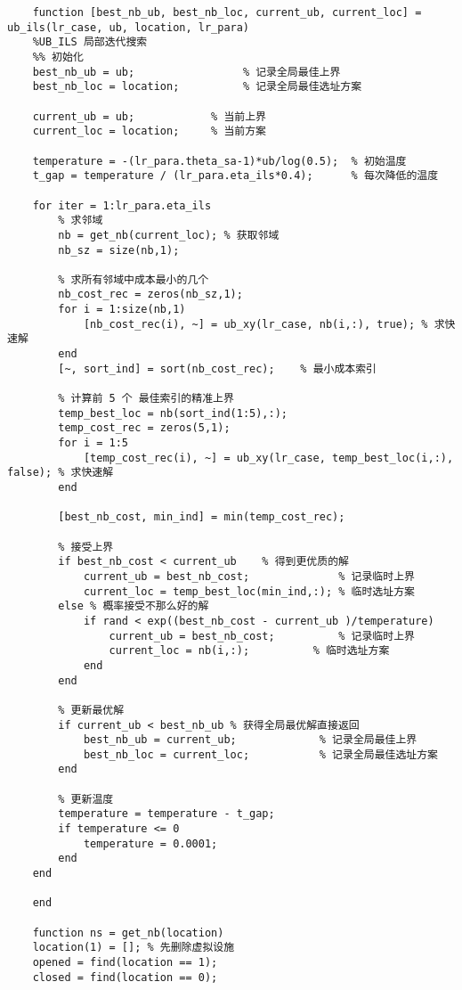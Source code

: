 {\begin{lstlisting}
    function [best_nb_ub, best_nb_loc, current_ub, current_loc] = ub_ils(lr_case, ub, location, lr_para)
    %UB_ILS 局部迭代搜索
    %% 初始化
    best_nb_ub = ub;                 % 记录全局最佳上界
    best_nb_loc = location;          % 记录全局最佳选址方案

    current_ub = ub;            % 当前上界
    current_loc = location;     % 当前方案

    temperature = -(lr_para.theta_sa-1)*ub/log(0.5);  % 初始温度
    t_gap = temperature / (lr_para.eta_ils*0.4);      % 每次降低的温度

    for iter = 1:lr_para.eta_ils
        % 求邻域
        nb = get_nb(current_loc); % 获取邻域
        nb_sz = size(nb,1);

        % 求所有邻域中成本最小的几个
        nb_cost_rec = zeros(nb_sz,1);
        for i = 1:size(nb,1)
            [nb_cost_rec(i), ~] = ub_xy(lr_case, nb(i,:), true); % 求快速解
        end
        [~, sort_ind] = sort(nb_cost_rec);    % 最小成本索引

        % 计算前 5 个 最佳索引的精准上界
        temp_best_loc = nb(sort_ind(1:5),:);
        temp_cost_rec = zeros(5,1);
        for i = 1:5
            [temp_cost_rec(i), ~] = ub_xy(lr_case, temp_best_loc(i,:), false); % 求快速解
        end
        
        [best_nb_cost, min_ind] = min(temp_cost_rec);

        % 接受上界
        if best_nb_cost < current_ub    % 得到更优质的解
            current_ub = best_nb_cost;              % 记录临时上界
            current_loc = temp_best_loc(min_ind,:); % 临时选址方案
        else % 概率接受不那么好的解
            if rand < exp((best_nb_cost - current_ub )/temperature)
                current_ub = best_nb_cost;          % 记录临时上界
                current_loc = nb(i,:);          % 临时选址方案
            end
        end
        
        % 更新最优解
        if current_ub < best_nb_ub % 获得全局最优解直接返回
            best_nb_ub = current_ub;             % 记录全局最佳上界
            best_nb_loc = current_loc;           % 记录全局最佳选址方案
        end
        
        % 更新温度
        temperature = temperature - t_gap;
        if temperature <= 0
            temperature = 0.0001;
        end
    end

    end

    function ns = get_nb(location)
    location(1) = []; % 先删除虚拟设施
    opened = find(location == 1);
    closed = find(location == 0);


\end{lstlisting}}
